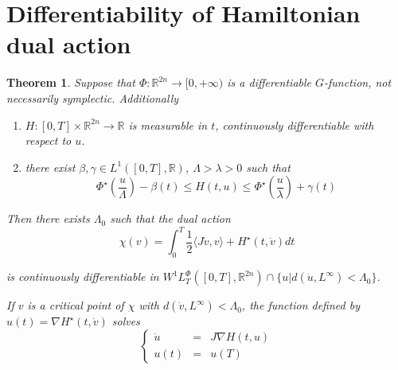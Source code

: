 \documentclass[twoside]{article}
\newtheorem{thm}{Theorem}[section]
\theoremstyle{remark}
\newcommand{\lphi}{L^{\Phi}}
\newcommand{\wphit}{W^{1}\lphi_T}
\newcommand{\rr}{\mathbb{R}}
\renewcommand{\leq}{\leqslant}
\begin{document}
\section{Differentiability of Hamiltonian dual action}

\begin{thm}\label{thm:DiffDualAct}
Suppose that $\Phi:\rr^{2n}\to [0,+\infty)$ is a differentiable $G$-function, not necessarily symplectic. Additionally
\begin{enumerate}
\item \label{it:h1-prop-H}
$H:[0,T]\times\rr^{2n}\to \rr$ is measurable in $t$, continuously differentiable with respect to $u$.
\item \label{it:h2-cotaH-conjphi}there exist $\beta, \gamma \in L^1([0,T],\rr)$, $\Lambda>\lambda>0$ such that
\begin{equation}\label{eq:cota-H-phi-conj}
\Phi^{\star}\left(\frac{u}{\Lambda}\right)-\beta(t)\leq H(t,u) \leq \Phi^{\star}\left(\frac{u}{\lambda}\right)+\gamma(t)
\end{equation}
\end{enumerate}
Then there exists $\Lambda_0$ such that the dual action
\begin{equation}\label{eq:DualAct}
 \chi(v)=\int_0^T \frac{1}{2} \langle J\dot{v},v\rangle+H^{\star}(t,\dot{v})  dt
\end{equation}



is continuously differentiable in $\wphit([0,T],\rr^{2n}) \cap \{u|d(\dot{u},L^{\infty})<\Lambda_0\}$.

If $v$ is a critical point of $\chi$ with $d(\dot{v},L^{\infty})<\Lambda_0$, the function defined by 
$u(t)=\nabla  H^{\star}(t,\dot{v})$
solves 
\[
\left\{\begin{array} {lll}
\dot{u}&=&J\nabla H (t,u)
\\
u(t)&=&u(T)
\end{array}
\right.
\]
\end{thm}
\end{document}
